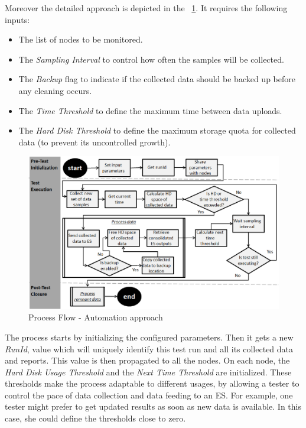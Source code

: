 \documentclass[runningheads,a4paper]{llncs}
\begin{document}
Moreover the detailed approach is depicted in the \figurename
~\ref{fig_ApproachDiagram}. It requires the following inputs: 
\vspace{-7pt}
\begin{itemize}
	\item The list of nodes to be monitored.
	\item The \emph{Sampling Interval} to control how often the samples will be
	collected.
	\item The \emph{Backup} flag to indicate if the collected data should be backed
	up before any cleaning occurs.
	\item The \emph{Time Threshold} to define the maximum time between data
	uploads.
	\item The \emph{Hard Disk Threshold} to define the maximum storage quota for
	collected data (to prevent its uncontrolled growth).
\end{itemize}

\begin{figure}[!h]
\centering
\includegraphics[totalheight=.35\textheight,width=1.0\textwidth]{ApproachDiagram}
\caption{Process Flow - Automation approach}
\label{fig_ApproachDiagram}
\end{figure}

The process starts
by initializing the
configured parameters. Then it gets a new \emph{RunId}, value which will
uniquely identify this test run and all its collected data and reports. This
value is then propagated to all the nodes. On each node, the \emph{Hard Disk
Usage Threshold} and  the \emph{Next Time Threshold} are initialized. These thresholds 
make the process adaptable to different usages, by allowing a tester to control
the pace of data collection and data feeding to an ES. For example, one tester might 
prefer to get updated results as soon as new data is available. In this case,
she could define the thresholds close to zero.
\end{document}

